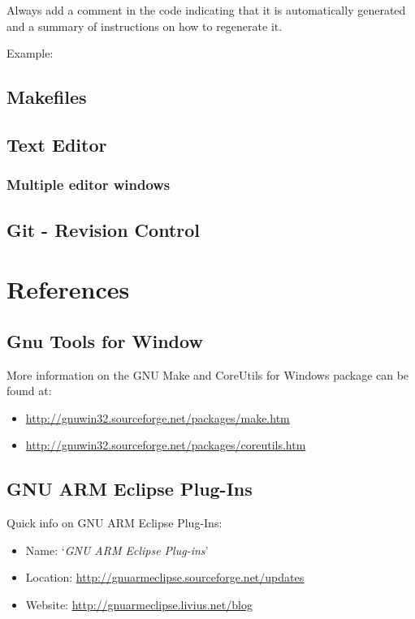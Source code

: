 Always add a comment in the code indicating that it is automatically generated and a summary of instructions on how to regenerate it.

Example:

\subsection{Makefiles}

\subsection{Text Editor}

\subsubsection{Multiple editor windows}

\subsection{Git - Revision Control}

\section {References}

\subsection {Gnu Tools for Window}

More information on the GNU Make and CoreUtils for Windows package can be found at:

\begin{itemize}
\tightlist
\item
  {\href{http://gnuwin32.sourceforge.net/packages/make.html}{http://gnuwin32.sourceforge.net/packages/make.htm}}
\item
  {\href{http://gnuwin32.sourceforge.net/packages/coreutils.htm}{http://gnuwin32.sourceforge.net/packages/coreutils.htm}}
\end{itemize}

\subsection{GNU ARM Eclipse Plug-Ins}

{Quick info on GNU ARM Eclipse Plug-Ins:}

\begin{itemize}
\tightlist
\item
  {Name: }{`\emph{GNU ARM Eclipse Plug-ins}'}
\item
  {Location:
  }{\href{http://gnuarmeclipse.sourceforge.net/updates}{http://gnuarmeclipse.sourceforge.net/updates}}
\item
  {Website:
  }{\href{http://gnuarmeclipse.livius.net/blog}{http://gnuarmeclipse.livius.net/blog}}
\end{itemize}


